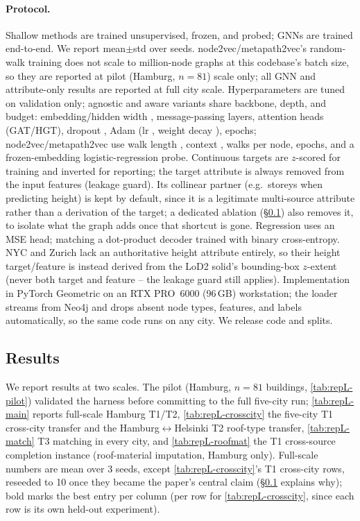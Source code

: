 \paragraph{Protocol.} Shallow methods are trained unsupervised, frozen, and
probed; GNNs are trained end-to-end. We report mean$\pm$std over  seeds.
node2vec/metapath2vec's random-walk training does not scale to million-node
graphs at this codebase's batch size, so they are reported at pilot (Hamburg,
$n{=}81$) scale only; all GNN and attribute-only results are reported at full
city scale. Hyperparameters are tuned on validation only; agnostic and aware
variants share backbone, depth, and budget: embedding/hidden width ,
 message-passing layers,  attention heads (GAT/HGT), dropout
, Adam (lr , weight decay ),
 epochs;
node2vec/metapath2vec use walk length , context ,  walks
per node,  epochs, and a frozen-embedding logistic-regression probe.
Continuous targets are $z$-scored for training and inverted for reporting; the
target attribute is always removed from the input features (leakage guard).
Its collinear partner (e.g.\ storeys when predicting height) is kept by
default, since it is a legitimate multi-source attribute rather than a
derivation of the target; a dedicated ablation (\S\ref{sec:repL:results}) also
removes it, to isolate what the graph adds once that shortcut is gone.
Regression uses an MSE head; matching a dot-product decoder trained with
binary cross-entropy. NYC and Zurich lack an authoritative height attribute
entirely, so their height target/feature is instead derived from the LoD2
solid's bounding-box $z$-extent (never both target and feature -- the leakage
guard still applies). Implementation in PyTorch Geometric on an RTX PRO~6000
(96\,GB) workstation; the loader streams from Neo4j and drops absent node
types, features, and labels automatically, so the same code runs on any city.
We release code and splits.

\subsection{Results}
\label{sec:repL:results}
We report results at two scales. The pilot (Hamburg, $n{=}81$ buildings,
\cref{tab:repL-pilot}) validated the harness before committing to the full
five-city run; \cref{tab:repL-main} reports full-scale Hamburg T1/T2,
\cref{tab:repL-crosscity} the five-city T1 cross-city transfer and the
Hamburg$\leftrightarrow$Helsinki T2 roof-type transfer, \cref{tab:repL-match}
T3 matching in every city, and \cref{tab:repL-roofmat} the T1 cross-source
completion instance (roof-material imputation, Hamburg only). Full-scale
numbers are mean over 3 seeds, except \cref{tab:repL-crosscity}'s T1
cross-city rows, reseeded to 10 once they became the paper's central claim
(\S\ref{sec:repL:results} explains why); bold marks
the best entry per column (per row for \cref{tab:repL-crosscity}, since each
row is its own held-out experiment).

